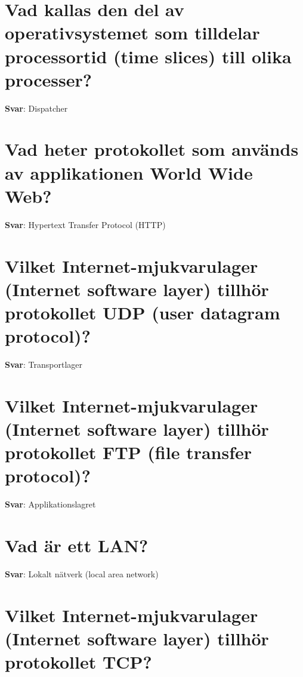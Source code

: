 \documentclass[a4paper,11pt,oneside]{book}
\begin{document}
\begin{sloppypar}
\section{Vad kallas den del av operativsystemet som tilldelar processortid (time slices) till olika processer?}

\label{q:17:sa:sv:True}

\textbf{Svar}: Dispatcher



\section{Vad heter protokollet som anv\"ands av applikationen World Wide Web?}

\label{q:18:sa:sv:True}

\textbf{Svar}: Hypertext Transfer Protocol (HTTP)



\section{Vilket Internet-mjukvarulager (Internet software layer) tillh\"or protokollet UDP (user datagram protocol)?}

\label{q:19:sa:sv:True}

\textbf{Svar}: Transportlager



\section{Vilket Internet-mjukvarulager (Internet software layer) tillh\"or protokollet FTP (file transfer protocol)?}

\label{q:20:sa:sv:True}

\textbf{Svar}: Applikationslagret



\section{Vad \"ar ett LAN?}

\label{q:21:sa:sv:True}

\textbf{Svar}: Lokalt n\"atverk (local area network)



\section{Vilket Internet-mjukvarulager (Internet software layer) tillh\"or protokollet TCP?}


\end{sloppypar}
\end{document}
